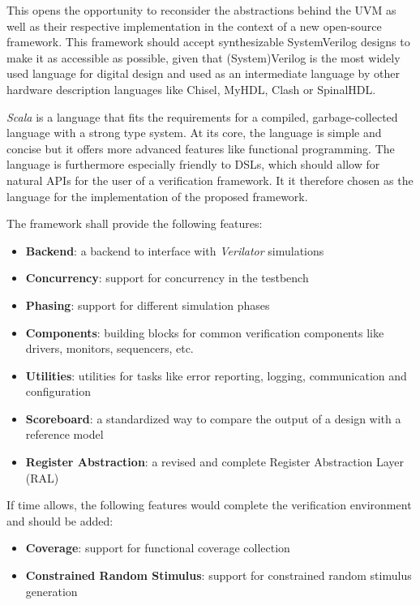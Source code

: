 \documentclass[11pt]{article}
\begin{document}
This opens the opportunity to reconsider the abstractions behind the UVM as well as their respective implementation in the context of a new open-source framework. This framework should accept synthesizable SystemVerilog designs to make it as accessible as possible, given that (System)Verilog is the most widely used language for digital design and used as an intermediate language by other hardware description languages like Chisel, MyHDL, Clash or SpinalHDL.

\textit{Scala} is a language that fits the requirements for a compiled, garbage-collected language with a strong type system. At its core, the language is simple and concise but it offers more advanced features like functional programming. The language is furthermore especially friendly to DSLs, which should allow for natural APIs for the user of a verification framework. It it therefore chosen as the language for the implementation of the proposed framework.


\noindent The framework shall provide the following features:

\begin{itemize}
    \item \textbf{Backend}: a backend to interface with \textit{Verilator} simulations
    \item \textbf{Concurrency}: support for concurrency in the testbench
    \item \textbf{Phasing}: support for different simulation phases
    \item \textbf{Components}: building blocks for common verification components like drivers, monitors, sequencers, etc.
    \item \textbf{Utilities}: utilities for tasks like error reporting, logging, communication and configuration
    \item \textbf{Scoreboard}: a standardized way to compare the output of a design with a reference model
    \item \textbf{Register Abstraction}: a revised and complete Register Abstraction Layer (RAL)
\end{itemize}

\noindent If time allows, the following features would complete the verification environment and should be added:

\begin{itemize}
    \item \textbf{Coverage}: support for functional coverage collection
    \item \textbf{Constrained Random Stimulus}: support for constrained random stimulus generation
\end{itemize}
\end{document}
